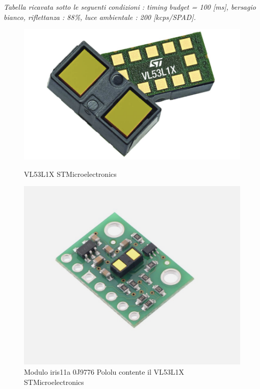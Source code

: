 \documentclass[11pt]{report}
\begin{document}
\begin{center}
    \footnotesize \textit{Tabella ricavata sotto le seguenti condizioni : \textit{timing budget} = 100 [ms], bersagio bianco, riflettanza : 88\%, luce ambientale : 200 [kcps/SPAD].}
\end{center}
\begin{figure}[H]
    \centering
    \begin{minipage}{0.45\textwidth}
        \centering
        \includegraphics[width=\textwidth]{images/Immagine_3_VL53L1X.png}
        \caption{VL53L1X STMicroelectronics}
        \label{fig:img1}
    \end{minipage}
    \hfill
    \begin{minipage}{0.45\textwidth}
        \centering
        \includegraphics[width=\textwidth]{images/Immagine_4_Pololu.png}
        \caption{Modulo iris11a 0J9776 Pololu contente il VL53L1X STMicroelectronics}
        \label{fig:img2}
    \end{minipage}
\end{figure}
\end{document}
